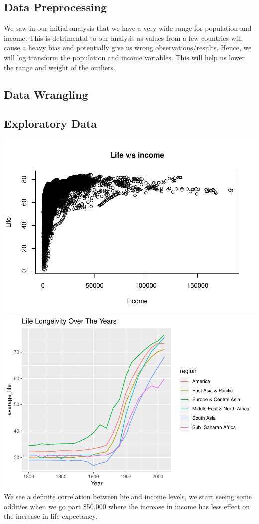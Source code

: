 \documentclass[]{article}
\begin{document}
\hypertarget{data-preprocessing}{%
\subsection{Data Preprocessing}\label{data-preprocessing}}

We saw in our initial analysis that we have a very wide range for
population and income. This is detrimental to our analysis as values
from a few countries will cause a heavy bias and potentially give us
wrong observations/results. Hence, we will log transform the population
and income variables. This will help us lower the range and weight of
the outliers.

\hypertarget{data-wrangling}{%
\subsection{Data Wrangling}\label{data-wrangling}}

\hypertarget{exploratory-data}{%
\subsection{Exploratory Data}\label{exploratory-data}}

\includegraphics{Final_Project_files/figure-latex/Plots-1.pdf}
\includegraphics{Final_Project_files/figure-latex/Plots-2.pdf} We see a
definite correlation between life and income levels, we start seeing
some oddities when we go part \$50,000 where the increase in income has
less effect on the increase in life expectancy.
\end{document}

